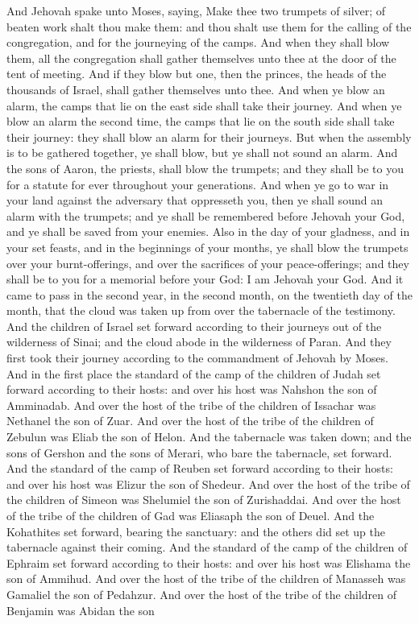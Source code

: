And Jehovah spake unto Moses, saying, Make thee two trumpets of silver; of beaten work shalt thou make them: and thou shalt use them for the calling of the congregation, and for the journeying of the camps. And when they shall blow them, all the congregation shall gather themselves unto thee at the door of the tent of meeting. And if they blow but one, then the princes, the heads of the thousands of Israel, shall gather themselves unto thee. And when ye blow an alarm, the camps that lie on the east side shall take their journey. And when ye blow an alarm the second time, the camps that lie on the south side shall take their journey: they shall blow an alarm for their journeys. But when the assembly is to be gathered together, ye shall blow, but ye shall not sound an alarm. And the sons of Aaron, the priests, shall blow the trumpets; and they shall be to you for a statute for ever throughout your generations. And when ye go to war in your land against the adversary that oppresseth you, then ye shall sound an alarm with the trumpets; and ye shall be remembered before Jehovah your God, and ye shall be saved from your enemies. Also in the day of your gladness, and in your set feasts, and in the beginnings of your months, ye shall blow the trumpets over your burnt-offerings, and over the sacrifices of your peace-offerings; and they shall be to you for a memorial before your God: I am Jehovah your God.  And it came to pass in the second year, in the second month, on the twentieth day of the month, that the cloud was taken up from over the tabernacle of the testimony. And the children of Israel set forward according to their journeys out of the wilderness of Sinai; and the cloud abode in the wilderness of Paran. And they first took their journey according to the commandment of Jehovah by Moses. And in the first place the standard of the camp of the children of Judah set forward according to their hosts: and over his host was Nahshon the son of Amminadab. And over the host of the tribe of the children of Issachar was Nethanel the son of Zuar. And over the host of the tribe of the children of Zebulun was Eliab the son of Helon.  And the tabernacle was taken down; and the sons of Gershon and the sons of Merari, who bare the tabernacle, set forward. And the standard of the camp of Reuben set forward according to their hosts: and over his host was Elizur the son of Shedeur. And over the host of the tribe of the children of Simeon was Shelumiel the son of Zurishaddai. And over the host of the tribe of the children of Gad was Eliasaph the son of Deuel.  And the Kohathites set forward, bearing the sanctuary: and the others did set up the tabernacle against their coming. And the standard of the camp of the children of Ephraim set forward according to their hosts: and over his host was Elishama the son of Ammihud. And over the host of the tribe of the children of Manasseh was Gamaliel the son of Pedahzur. And over the host of the tribe of the children of Benjamin was Abidan the son 